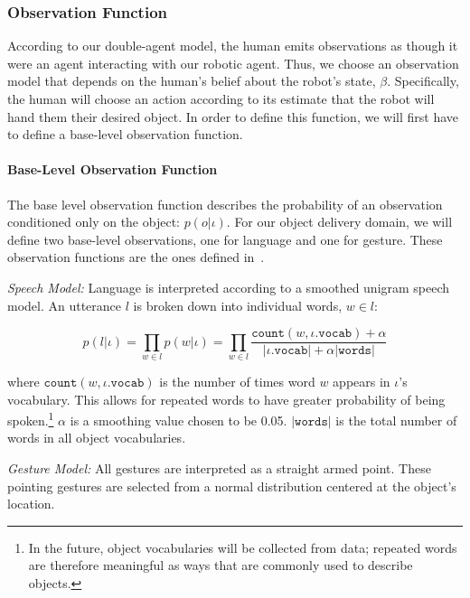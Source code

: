 \documentclass[conference]{IEEEtran}
\begin{document}
\subsubsection{Observation Function} \label{sssec:of}

According to our double-agent model, the human emits observations as though it were an agent interacting with our robotic agent. Thus, we choose an observation model that depends on the human's belief about the robot's state, $\beta$. Specifically, the human will choose an action according to its estimate that the robot will hand them their desired object. In order to define this function, we will first have to define a base-level observation function. 

\paragraph{Base-Level Observation Function} \label{baseobs}

The base level observation function describes the probability of an observation conditioned only on the object: $p(o|\iota)$. For our object delivery domain, we will define two base-level observations, one for language and one for gesture. These observation functions are the ones defined in~\citet{eldon15thesis}. 

\vspace{0.5em}

\noindent\textit{Speech Model:} Language is interpreted according to a smoothed unigram speech model. An utterance $l$ is broken down into individual words, $w \in l$: 

\begin{equation*}
	p(l|\iota) = \prod_{w \in l} p(w|\iota) = \prod_{w\in l} \frac{\texttt{count}(w, \iota.\texttt{vocab}) + \alpha}{|\iota.\texttt{vocab}| + \alpha |\texttt{words}|}
\end{equation*}

where $\texttt{count}(w, \iota.\texttt{vocab})$ is the number of times word $w$ appears in $\iota$'s vocabulary. This allows for repeated words to have greater probability of being spoken.\footnote{In the future, object vocabularies will be collected from data; repeated words are therefore meaningful as ways that are commonly used to describe objects.}  $\alpha$ is a smoothing value chosen to be 0.05.  $|\texttt{words}|$ is the total number of words in all object vocabularies. 
\vspace{0.5em}

\noindent\textit{Gesture Model:} All gestures are interpreted as a straight armed point. These pointing gestures are selected from a normal distribution centered at the object's location. 
\end{document}
